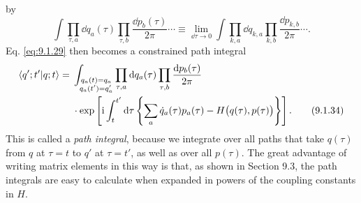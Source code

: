 by
\begin{equation}
  \int\prod_{\tau,a}\dd q_a(\tau)\prod_{\tau,b}\frac{\dd p_b(\tau)}{2\pi}\cdots
  \equiv\lim_{\dd\tau\to0}\int\prod_{k,a}\dd q_{k,a}
  \prod_{k,b}\frac{\dd p_{k,b}}{2\pi}\cdots.
  \tag{9.1.33}\label{eq:9.1.33}
\end{equation}
Eq. \eqref{eq:9.1.29} then becomes a constrained path integral
\begin{align}
  \langle q';t' | q;t\rangle
  ={}&\int_{\substack{q_a(t)=q_a\\q_a(t')=q'_a}}
  \prod_{\tau,a}\mathop{}\!\mathrm{d} q_a(\tau)\prod_{\tau,b}\frac{\mathop{}\!\mathrm{d} p_b(\tau)}{2\pi}
  \notag\\
  &\cdot\exp\left[\mathrm{i}\int_t^{t'}\mathop{}\!\mathrm{d}\tau
  \left\{\sum_a\dot q_a(\tau)p_a(\tau)
  -H\bigl(q(\tau),p(\tau)\bigr)\right\}\right].
  \tag{9.1.34}\label{eq:9.1.34}
\end{align}
This is called a \emph{path integral}, because we integrate over all paths
that take $q(\tau)$ from $q$ at $\tau=t$ to $q'$ at $\tau=t'$, as well as
over all $p(\tau)$. The great advantage of writing matrix elements in this
way is that, as shown in Section 9.3, the path integrals are easy to calculate
when expanded in powers of the coupling constants in $H$.

